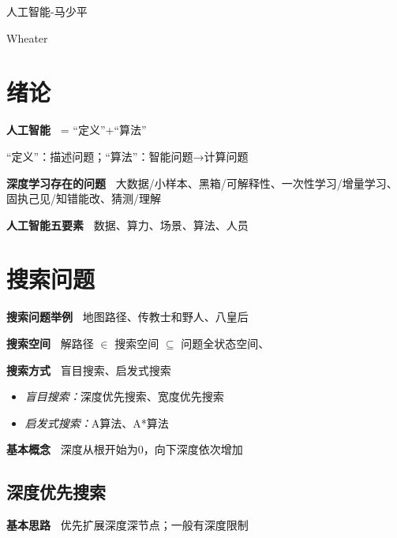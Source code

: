 \documentclass[b4paper, 10pt]{ctexart}
\begin{document}
\begin{multicols}{3}
\begin{center}
    {\Large 人工智能-马少平}

    Wheater

    \vspace*{-0.5em}

    \href{111}{\faGithub}

    \vspace*{-1em}
\end{center}

\section*{绪论}

\textbf{人工智能\ }  = “定义”+“算法”

“定义”：描述问题；“算法”：智能问题→计算问题

\textbf{深度学习存在的问题\ } 大数据/小样本、黑箱/可解释性、一次性学习/增量学习、固执己见/知错能改、猜测/理解

\textbf{人工智能五要素\ } 数据、算力、场景、算法、人员

\section{搜索问题}



\textbf{搜索问题举例\ } 地图路径、传教士和野人、八皇后

\textbf{搜索空间\ } 解路径 $\in$ 搜索空间 $\subseteq$ 问题全状态空间、

\textbf{搜索方式\ } 盲目搜索、启发式搜索

\begin{itemize}
    \item \emph{盲目搜索：}深度优先搜索、宽度优先搜索
    \item \emph{启发式搜索：}A算法、A*算法
\end{itemize}

\textbf{基本概念\ } 深度从根开始为0，向下深度依次增加

\subsection{深度优先搜索}

\textbf{基本思路\ } 
优先扩展深度深节点；一般有深度限制


\end{multicols}
\end{document}
